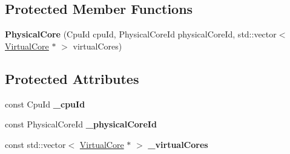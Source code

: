 \subsection*{Protected Member Functions}
\begin{DoxyCompactItemize}
\item 
\hypertarget{classmammut_1_1topology_1_1PhysicalCore_aaf7e5eb22971ccc42a2455484431c660}{{\bfseries Physical\-Core} (Cpu\-Id cpu\-Id, Physical\-Core\-Id physical\-Core\-Id, std\-::vector$<$ \hyperlink{classmammut_1_1topology_1_1VirtualCore}{Virtual\-Core} $\ast$ $>$ virtual\-Cores)}\label{classmammut_1_1topology_1_1PhysicalCore_aaf7e5eb22971ccc42a2455484431c660}

\end{DoxyCompactItemize}
\subsection*{Protected Attributes}
\begin{DoxyCompactItemize}
\item 
\hypertarget{classmammut_1_1topology_1_1PhysicalCore_a366e7d9045e2e0ce38c9a348856d41e6}{const Cpu\-Id {\bfseries \-\_\-cpu\-Id}}\label{classmammut_1_1topology_1_1PhysicalCore_a366e7d9045e2e0ce38c9a348856d41e6}

\item 
\hypertarget{classmammut_1_1topology_1_1PhysicalCore_ae1c83a9d2e61be31be246e9d0a2da0a0}{const Physical\-Core\-Id {\bfseries \-\_\-physical\-Core\-Id}}\label{classmammut_1_1topology_1_1PhysicalCore_ae1c83a9d2e61be31be246e9d0a2da0a0}

\item 
\hypertarget{classmammut_1_1topology_1_1PhysicalCore_a5d36d59b9bcc4e457a97d2797ce0c705}{const std\-::vector$<$ \hyperlink{classmammut_1_1topology_1_1VirtualCore}{Virtual\-Core} $\ast$ $>$ {\bfseries \-\_\-virtual\-Cores}}\label{classmammut_1_1topology_1_1PhysicalCore_a5d36d59b9bcc4e457a97d2797ce0c705}

\end{DoxyCompactItemize}


